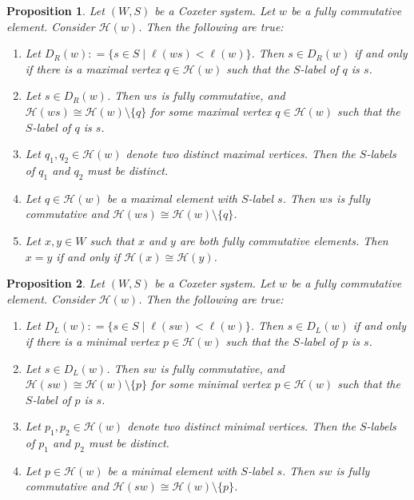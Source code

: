 \documentclass[10pt,a4paper]{amsart}
\newtheorem{prop}{Proposition}
\def\H#1{\mathcal{H}(#1)}
\begin{document}
\begin{prop} \label{removemaxprop}
    Let $ (W,S)$ be a Coxeter system. Let $ w$ be a fully commutative element. Consider $\H{w}$. Then the following are true:

    \begin{enumerate}
        \item Let $ D_{R}(w) : = \{ s\in S \mid \ell(ws) < \ell(w)  \}$.
        Then $ s\in D_{R}(w)$ if and only if there is a maximal vertex $ q\in \H{w}$ such that the $S$-label of $ q$ is $s$.

        \item Let $ s\in D_{R}(w)$. Then $ ws$ is fully commutative, and $ \H{ws}\cong \H{w} \setminus \{ q \}$ for some maximal vertex $q\in \H{w}$ such that the $S$-label of $q$ is $s$.

        \item Let $ q_{1}, q_{2} \in \H{w}$ denote two distinct maximal vertices. Then the $S$-labels of $ q_{1}$ and $q_{2}$ must be distinct.

        \item Let $ q \in \H{w}$ be a maximal element with $ S$-label $s$. Then $ ws$ is fully commutative and $ \H{ws} \cong \H{w} \setminus \{ q  \}$.

        \item Let $ x,y\in W$ such that $ x$ and $ y$ are both fully commutative elements. Then $ x=y$ if and only if $ \H{x} \cong \H{y}$.
    \end{enumerate}
\end{prop}

\begin{prop} \label{removeminprop}
    Let $ (W,S)$ be a Coxeter system. Let $ w$ be a fully commutative element. Consider $\H{w}$. Then the following are true:

    \begin{enumerate}
        \item Let $ D_{L}(w) : = \{ s\in S \mid \ell(sw) < \ell(w)  \}$.
        Then $ s\in D_{L}(w)$ if and only if there is a minimal vertex $ p\in \H{w}$ such that the $S$-label of $ p$ is $s$.

        \item Let $ s\in D_{L}(w)$. Then $ sw$ is fully commutative, and $ \H{sw}\cong \H{w} \setminus \{ p \}$ for some minimal vertex $p\in \H{w}$ such that the $S$-label of $p$ is $s$.

        \item Let $ p_{1}, p_{2} \in \H{w}$ denote two distinct minimal vertices. Then the $S$-labels of $ p_{1}$ and $p_{2}$ must be distinct.

        \item Let $ p \in \H{w}$ be a minimal element with $ S$-label $s$. Then $ sw$ is fully commutative and $ \H{sw} \cong \H{w} \setminus \{ p  \}$.

    \end{enumerate}
\end{prop}
\end{document}
